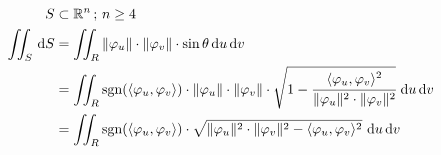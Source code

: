 \documentclass[12pt]{article}
\begin{document}
\begin{align}
S &\subset \mathbb{R}^n\,;\,n \ge 4 \\
\iint_S \,\mathrm{d}S &= \iint_R \Vert \varphi_u \Vert \cdot \Vert \varphi_v \Vert \cdot \sin \theta\,\mathrm{d}u\,\mathrm{d}v \\
&= \iint_R \text{sgn}(\langle \varphi_u, \varphi_v \rangle) \cdot \Vert \varphi_u \Vert \cdot \Vert \varphi_v \Vert \cdot \sqrt{1 - \cfrac{\langle \varphi_u, \varphi_v \rangle^2}{\Vert \varphi_u \Vert^2 \cdot \Vert \varphi_v \Vert^2}}\,\,\mathrm{d}u\,\mathrm{d}v \\
&= \iint_R \text{sgn}(\langle \varphi_u, \varphi_v \rangle) \cdot \sqrt{\Vert \varphi_u \Vert^2 \cdot \Vert \varphi_v \Vert^2 - \langle \varphi_u, \varphi_v \rangle^2}\,\,\mathrm{d}u\,\mathrm{d}v
\end{align}
\end{document}
